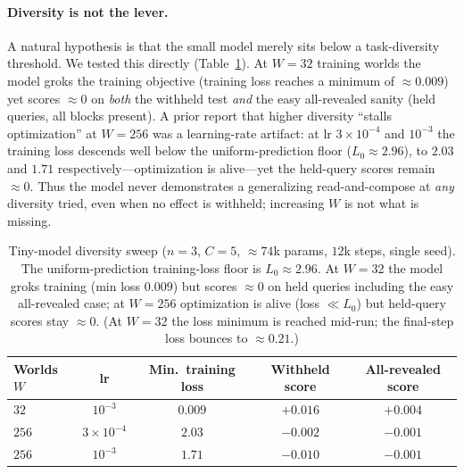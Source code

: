 \documentclass[11pt]{article}
\begin{document}
\paragraph{Diversity is not the lever.}
A natural hypothesis is that the small model merely sits below a task-diversity threshold. We tested this
directly (Table~\ref{tab:diversity}). At $W{=}32$ training worlds the model groks the training objective
(training loss reaches a minimum of $\approx 0.009$) yet scores $\approx 0$ on \emph{both} the withheld test
\emph{and} the easy all-revealed sanity (held queries, all blocks present). A prior report that higher
diversity ``stalls optimization'' at $W{=}256$ was a learning-rate artifact: at lr $3\!\times\!10^{-4}$ and
$10^{-3}$ the training loss descends well below the uniform-prediction floor ($L_0\approx 2.96$), to $2.03$
and $1.71$ respectively---optimization is alive---yet the held-query scores remain $\approx 0$. Thus the
model never demonstrates a generalizing read-and-compose at \emph{any} diversity tried, even when no effect
is withheld; increasing $W$ is not what is missing.

\begin{table}[t]
\centering
\small
\begin{tabular}{lcccc}
\toprule
Worlds $W$ & lr & Min.\ training loss & Withheld score & All-revealed score\\
\midrule
$32$  & $10^{-3}$          & $0.009$ & $+0.016$ & $+0.004$\\
$256$ & $3\times10^{-4}$   & $2.03$  & $-0.002$ & $-0.001$\\
$256$ & $10^{-3}$          & $1.71$  & $-0.010$ & $-0.001$\\
\bottomrule
\end{tabular}
\caption{Tiny-model diversity sweep ($n{=}3$, $C{=}5$, $\approx$$74$k params, $12$k steps, single seed).
The uniform-prediction training-loss floor is $L_0\approx 2.96$. At $W{=}32$ the model groks training
(min loss $0.009$) but scores $\approx 0$ on held queries including the easy all-revealed case; at $W{=}256$
optimization is alive (loss $\ll L_0$) but held-query scores stay $\approx 0$. (At $W{=}32$ the loss minimum
is reached mid-run; the final-step loss bounces to $\approx 0.21$.)}
\label{tab:diversity}
\end{table}

\end{document}
